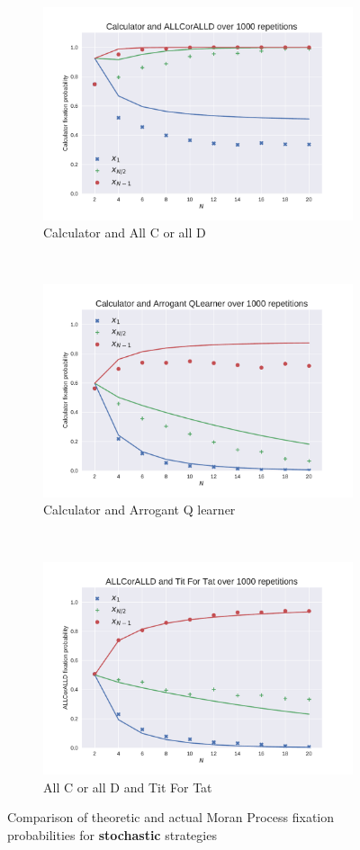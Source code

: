 \documentclass{article}
\begin{document}
\begin{figure}[!hbtp]
    \begin{subfigure}[t]{.3\textwidth}
        \centering
        \includegraphics[width=.8\textwidth]{../img/Calculator_v_ALLCorALLD.pdf}
        \caption{Calculator and All C or all D}
    \end{subfigure}%
    ~
    \begin{subfigure}[t]{.3\textwidth}
        \centering
        \includegraphics[width=.8\textwidth]{../img/Calculator_v_Arrogant_QLearner.pdf}
        \caption{Calculator and Arrogant Q learner}
    \end{subfigure}%
    ~
    \begin{subfigure}[t]{.3\textwidth}
        \centering
        \includegraphics[width=.8\textwidth]{../img/ALLCorALLD_v_Tit_For_Tat.pdf}
        \caption{All C or all D and Tit For Tat}
    \end{subfigure}%
    \caption{Comparison of theoretic and actual Moran Process
             fixation probabilities for \textbf{stochastic} strategies}
    \label{fig:comparison_stochastic}
\end{figure}
\end{document}
